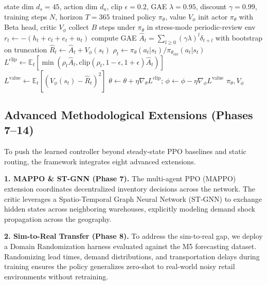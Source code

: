 \documentclass[review,preprint,authoryear,12pt]{elsarticle}
\begin{document}
\begin{algorithm}[H]
\caption{PPO with GAE and Beta-distribution actor for periodic-review inventory control}
\label{alg:ppo}
\begin{algorithmic}[1]
\Require state dim $d_s = 45$, action dim $d_a$, clip $\epsilon=0.2$, GAE $\lambda=0.95$, discount $\gamma=0.99$, training steps $N$, horizon $T=365$
\Ensure trained policy $\pi_\theta$, value $V_\phi$
\State init actor $\pi_\theta$ with Beta head, critic $V_\phi$
  \State collect $B$ steps under $\pi_\theta$ in stress-mode periodic-review env
    \State $r_t \gets -(h_t + c_t + e_t + u_t)$ 
  \EndFor
  \State compute GAE $\hat{A}_t = \sum_{l \geq 0} (\gamma\lambda)^l \delta_{t+l}$ with bootstrap on truncation
  \State $\hat{R}_t \gets \hat{A}_t + V_\phi(s_t)$
      \State $\rho_t \gets \pi_\theta(a_t | s_t) / \pi_{\theta_{\text{old}}}(a_t | s_t)$
      \State $L^{\text{clip}} \gets \mathbb{E}_t[\min(\rho_t \hat{A}_t, \mathrm{clip}(\rho_t, 1{-}\epsilon, 1{+}\epsilon)\hat{A}_t)]$
      \State $L^{\text{value}} \gets \mathbb{E}_t[(V_\phi(s_t) - \hat{R}_t)^2]$
      \State $\theta \gets \theta + \eta \nabla_\theta L^{\text{clip}}$; $\phi \gets \phi - \eta \nabla_\phi L^{\text{value}}$
    \EndFor
  \EndFor
\EndFor
\State \Return $\pi_\theta, V_\phi$
\end{algorithmic}
\end{algorithm}

\subsection{Advanced Methodological Extensions (Phases 7--14)}
\label{sec:methodology:advanced}

To push the learned controller beyond steady-state PPO baselines and static routing, the framework integrates eight advanced extensions.

\textbf{1. MAPPO \& ST-GNN (Phase 7).} The multi-agent PPO (MAPPO) extension coordinates decentralized inventory decisions across the network. The critic leverages a Spatio-Temporal Graph Neural Network (ST-GNN) to exchange hidden states across neighboring warehouses, explicitly modeling demand shock propagation across the geography.

\textbf{2. Sim-to-Real Transfer (Phase 8).} To address the sim-to-real gap, we deploy a Domain Randomization harness evaluated against the M5 forecasting dataset. Randomizing lead times, demand distributions, and transportation delays during training ensures the policy generalizes zero-shot to real-world noisy retail environments without retraining.
\end{document}
